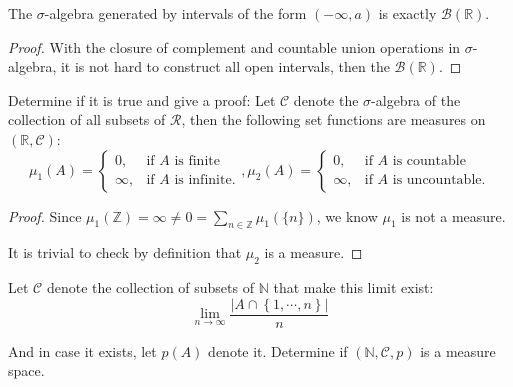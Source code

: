 \begin{problem}
The $ \sigma $-algebra generated by intervals of the form $ (-\infty,a) $ is exactly $ \mathcal{B}(\mathbb{R} ) $.
\end{problem}

\begin{proof}
	With the closure of complement and countable union operations in $ \sigma $-algebra,
	it is not hard to construct all open intervals,
	then the $ \mathcal{B}(\mathbb{R} ) $.
\end{proof}

\begin{problem}
Determine if it is true and give a proof: Let $ \mathcal{C} $ denote the $ \sigma $-algebra of the collection of
all subsets of $ \mathcal{R} $,
then the following set functions are measures on $ (\mathbb{R} ,\mathcal{C} ) $:
$$ \mu _1\left( A \right) =
	\begin{cases}
		0 ,      & \text{if }  A  \text{ is finite}    \\
		\infty , & \text{if }  A  \text{ is infinite.}
	\end{cases},
	\mu _2\left( A \right) =
	\begin{cases}
		0 ,      & \text{if }  A  \text{ is countable}    \\
		\infty , & \text{if }  A  \text{ is uncountable.}
	\end{cases}
$$
\end{problem}

\begin{proof}
	Since $
		\mu _1\left( \mathbb{Z} \right) =\infty \ne 0=\sum_{n\in \mathbb{Z}}^{}{\mu _1\left( \{n\} \right)}
	$, we know $ \mu_1 $ is not a measure.

	It is trivial to check by definition that $ \mu_2 $ is a measure.
\end{proof}

\begin{problem}
Let $ \mathcal{C}  $ denote the collection of subsets of $ \mathbb{N}  $ that make this limit exist:
$$
	\lim_{n\rightarrow \infty}\frac{|A\cap \left\{ 1,\cdots ,n \right\} |}{n}
$$

And in case it exists, let $ p(A) $ denote it. Determine if $ (\mathbb{N} ,\mathcal{C} ,p) $ is a measure space.
\end{problem}


